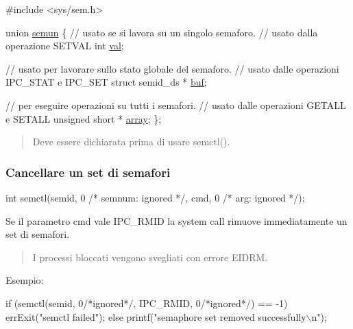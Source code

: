 \begin{DoxyCode}
\textcolor{preprocessor}{#include <sys/sem.h>}

\textcolor{keyword}{union }\hyperlink{unionsemun}{semun} \{
    \textcolor{comment}{// usato se si lavora su un singolo semaforo.}
    \textcolor{comment}{// usato dalla operazione SETVAL}
    \textcolor{keywordtype}{int} \hyperlink{unionsemun_ac6121ecb6d04a024e07e12bd71b94031}{val};

    \textcolor{comment}{// usato per lavorare sullo stato globale del semaforo.}
    \textcolor{comment}{// usato dalle operazioni IPC\_STAT e IPC\_SET}
    \textcolor{keyword}{struct }semid\_ds * \hyperlink{unionsemun_abe0ba6ad77214cee618027739e992503}{buf};

    \textcolor{comment}{// per eseguire operazioni su tutti i semafori.}
    \textcolor{comment}{// usato dalle operazioni GETALL e SETALL}
    \textcolor{keywordtype}{unsigned} \textcolor{keywordtype}{short} * \hyperlink{unionsemun_a1c74eb9326763d3854dc90167e1f4460}{array};
\};
\end{DoxyCode}
 \begin{quote}
Deve essere dichiarata prima di usare {\ttfamily semctl()}. \end{quote}


\subsubsection*{Cancellare un set di semafori}


\begin{DoxyCode}
\textcolor{keywordtype}{int} semctl(semid, 0 \textcolor{comment}{/* semnum: ignored */}, cmd, 0 \textcolor{comment}{/* arg: ignored */});
\end{DoxyCode}


Se il parametro {\ttfamily cmd} vale {\ttfamily I\+P\+C\+\_\+\+R\+M\+ID} la system call rimuove immediatamente un set di semafori. \begin{quote}
I processi bloccati vengono svegliati con errore {\ttfamily E\+I\+D\+RM}. \end{quote}


Esempio\+: 
\begin{DoxyCode}
\textcolor{keywordflow}{if} (semctl(semid, 0\textcolor{comment}{/*ignored*/}, IPC\_RMID, 0\textcolor{comment}{/*ignored*/}) == -1)
    errExit(\textcolor{stringliteral}{"semctl failed"});
\textcolor{keywordflow}{else}
    printf(\textcolor{stringliteral}{"semaphore set removed successfully\(\backslash\)n"});
\end{DoxyCode}


